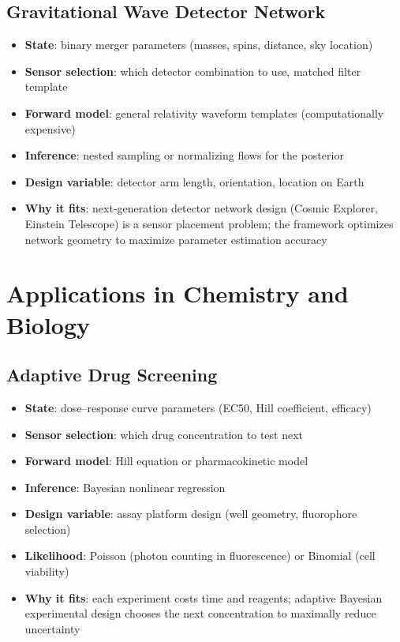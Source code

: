\documentclass[11pt,a4paper]{article}
\begin{document}
\subsection{Gravitational Wave Detector Network}

\begin{itemize}[nosep]
  \item \textbf{State}: binary merger parameters (masses, spins, distance, sky location)
  \item \textbf{Sensor selection}: which detector combination to use, matched filter template
  \item \textbf{Forward model}: general relativity waveform templates (computationally expensive)
  \item \textbf{Inference}: nested sampling or normalizing flows for the posterior
  \item \textbf{Design variable}: detector arm length, orientation, location on Earth
  \item \textbf{Why it fits}: next-generation detector network design (Cosmic Explorer, Einstein Telescope) is a sensor placement problem; the framework optimizes network geometry to maximize parameter estimation accuracy
\end{itemize}

\section{Applications in Chemistry and Biology}

\subsection{Adaptive Drug Screening}

\begin{itemize}[nosep]
  \item \textbf{State}: dose--response curve parameters (EC50, Hill coefficient, efficacy)
  \item \textbf{Sensor selection}: which drug concentration to test next
  \item \textbf{Forward model}: Hill equation or pharmacokinetic model
  \item \textbf{Inference}: Bayesian nonlinear regression
  \item \textbf{Design variable}: assay platform design (well geometry, fluorophore selection)
  \item \textbf{Likelihood}: Poisson (photon counting in fluorescence) or Binomial (cell viability)
  \item \textbf{Why it fits}: each experiment costs time and reagents; adaptive Bayesian experimental design chooses the next concentration to maximally reduce uncertainty
\end{itemize}
\end{document}
